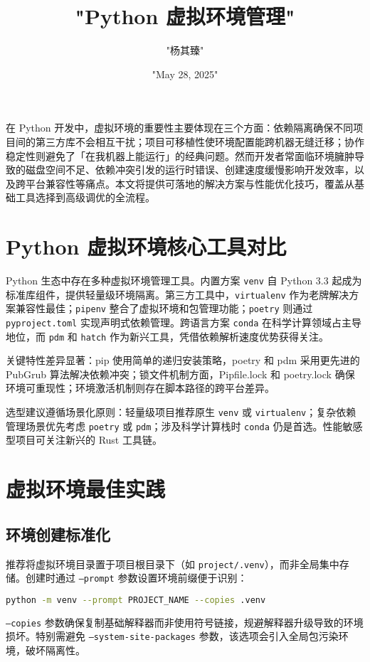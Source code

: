 \title{"Python 虚拟环境管理"}
\author{"杨其臻"}
\date{"May 28, 2025"}
\maketitle
在 Python 开发中，虚拟环境的重要性主要体现在三个方面：依赖隔离确保不同项目间的第三方库不会相互干扰；项目可移植性使环境配置能跨机器无缝迁移；协作稳定性则避免了「在我机器上能运行」的经典问题。然而开发者常面临环境臃肿导致的磁盘空间不足、依赖冲突引发的运行时错误、创建速度缓慢影响开发效率，以及跨平台兼容性等痛点。本文将提供可落地的解决方案与性能优化技巧，覆盖从基础工具选择到高级调优的全流程。\par
\chapter{Python 虚拟环境核心工具对比}
Python 生态中存在多种虚拟环境管理工具。内置方案 \texttt{venv} 自 Python 3.3 起成为标准库组件，提供轻量级环境隔离。第三方工具中，\texttt{virtualenv} 作为老牌解决方案兼容性最佳；\texttt{pipenv} 整合了虚拟环境和包管理功能；\texttt{poetry} 则通过 \texttt{pyproject.toml} 实现声明式依赖管理。跨语言方案 \texttt{conda} 在科学计算领域占主导地位，而 \texttt{pdm} 和 \texttt{hatch} 作为新兴工具，凭借依赖解析速度优势获得关注。\par
关键特性差异显著：pip 使用简单的递归安装策略，poetry 和 pdm 采用更先进的 PubGrub 算法解决依赖冲突；锁文件机制方面，Pipfile.lock 和 poetry.lock 确保环境可重现性；环境激活机制则存在脚本路径的跨平台差异。\par
选型建议遵循场景化原则：轻量级项目推荐原生 \texttt{venv} 或 \texttt{virtualenv}；复杂依赖管理场景优先考虑 \texttt{poetry} 或 \texttt{pdm}；涉及科学计算栈时 \texttt{conda} 仍是首选。性能敏感型项目可关注新兴的 Rust 工具链。\par
\chapter{虚拟环境最佳实践}
\section{环境创建标准化}
推荐将虚拟环境目录置于项目根目录下（如 \texttt{project/.venv}），而非全局集中存储。创建时通过 \texttt{--prompt} 参数设置环境前缀便于识别：\par
\begin{lstlisting}[language=bash]
python -m venv --prompt PROJECT_NAME --copies .venv
\end{lstlisting}
\texttt{--copies} 参数确保复制基础解释器而非使用符号链接，规避解释器升级导致的环境损坏。特别需避免 \texttt{--system-site-packages} 参数，该选项会引入全局包污染环境，破坏隔离性。\par

